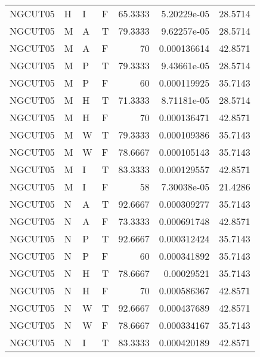 \begin{longtable}{llllrrr}
    NGCUT05  & H         & I         & F          & 65.3333    & 5.20229e-05 & 28.5714  \\
    NGCUT05  & M         & A         & T          & 79.3333    & 9.62257e-05 & 28.5714  \\
    NGCUT05  & M         & A         & F          & 70         & 0.000136614 & 42.8571  \\
    NGCUT05  & M         & P         & T          & 79.3333    & 9.43661e-05 & 28.5714  \\
    NGCUT05  & M         & P         & F          & 60         & 0.000119925 & 35.7143  \\
    NGCUT05  & M         & H         & T          & 71.3333    & 8.71181e-05 & 28.5714  \\
    NGCUT05  & M         & H         & F          & 70         & 0.000136471 & 42.8571  \\
    NGCUT05  & M         & W         & T          & 79.3333    & 0.000109386 & 35.7143  \\
    NGCUT05  & M         & W         & F          & 78.6667    & 0.000105143 & 35.7143  \\
    NGCUT05  & M         & I         & T          & 83.3333    & 0.000129557 & 42.8571  \\
    NGCUT05  & M         & I         & F          & 58         & 7.30038e-05 & 21.4286  \\
    NGCUT05  & N         & A         & T          & 92.6667    & 0.000309277 & 35.7143  \\
    NGCUT05  & N         & A         & F          & 73.3333    & 0.000691748 & 42.8571  \\
    NGCUT05  & N         & P         & T          & 92.6667    & 0.000312424 & 35.7143  \\
    NGCUT05  & N         & P         & F          & 60         & 0.000341892 & 35.7143  \\
    NGCUT05  & N         & H         & T          & 78.6667    & 0.00029521  & 35.7143  \\
    NGCUT05  & N         & H         & F          & 70         & 0.000586367 & 42.8571  \\
    NGCUT05  & N         & W         & T          & 92.6667    & 0.000437689 & 42.8571  \\
    NGCUT05  & N         & W         & F          & 78.6667    & 0.000334167 & 35.7143  \\
    NGCUT05  & N         & I         & T          & 83.3333    & 0.000420189 & 42.8571  \\

\end{longtable}
